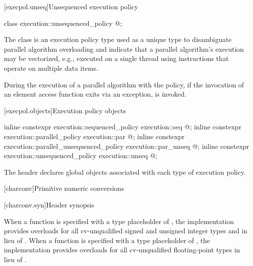 [execpol.unseq]{Unsequenced execution policy}

%
\begin{itemdecl}
class execution::unsequenced_policy { @\unspec@ };
\end{itemdecl}

\pnum
The class  is an execution policy type
used as a unique type to disambiguate parallel algorithm overloading and
indicate that a parallel algorithm's execution may be vectorized,
e.g., executed on a single thread using instructions
that operate on multiple data items.

\pnum
During the execution of a parallel algorithm with
the  policy,
if the invocation of an element access function exits via an exception,
 is invoked.

[execpol.objects]{Execution policy objects}

%
%
%
%
%
%
\begin{itemdecl}
inline constexpr execution::sequenced_policy            execution::seq{ @\unspec@ };
inline constexpr execution::parallel_policy             execution::par{ @\unspec@ };
inline constexpr execution::parallel_unsequenced_policy execution::par_unseq{ @\unspec@ };
inline constexpr execution::unsequenced_policy          execution::unseq{ @\unspec@ };
\end{itemdecl}

\begin{itemdescr}
\pnum
The header  declares global objects associated with each type of execution policy.
\end{itemdescr}

[charconv]{Primitive numeric conversions}

[charconv.syn]{Header  synopsis}

\pnum
When a function is specified
with a type placeholder of ,
the implementation provides overloads
for all cv-unqualified signed and unsigned integer types and 
in lieu of .
When a function is specified
with a type placeholder of ,
the implementation provides overloads
for all cv-unqualified floating-point types
in lieu of .

